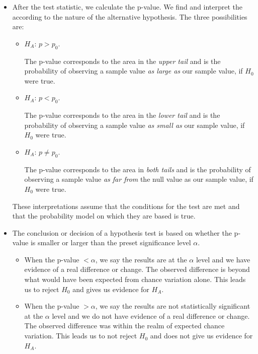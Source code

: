 \begin{itemize}
\item After the test statistic, we calculate the p-value.  We find and interpret the  according to the nature of the alternative hypothesis.  The three possibilities are:\vspace{-1mm}
\begin{itemize}
\item[] $H_A$: $p>p_0$. \quad\parbox[t]{3.84in}{The p-value corresponds to the area in the \emph{upper tail} and is the probability of observing a sample value \textit{as large as} our sample value, if $H_0$ were true. }
\item[] $H_A$: $p < p_0$. \quad\parbox[t]{3.84in}{The p-value corresponds to the area in the \emph{lower tail} and is the probability of observing a sample value \textit{as small as} our sample value, if $H_0$ were true. }
\item[] $H_A$: $p \ne p_0$. \quad\parbox[t]{3.84in}{The p-value corresponds to the area in \emph{both tails} and is the probability of observing a sample value \textit{as far from} the null value as our sample value, if $H_0$ were true. }
\end{itemize}
These interpretations assume that the conditions for the test are met and that the probability model on which they are based is true.

\item The conclusion or decision of a hypothesis test is based on whether the p-value is smaller or larger than the preset significance level $\alpha$. \vspace{-1mm}
\begin{itemize}
\item When the  p-value $< \alpha$, we say the results are  at the $\alpha$ level and we have evidence of a real difference or change.  The observed difference is beyond what would have been expected from chance variation alone.  This leads us to reject $H_0$ and gives us evidence for $H_A$.
\item When the  p-value $> \alpha$, we say the results are not statistically significant at the $\alpha$ level and we do not have evidence of a real difference or change.  The observed difference was within the realm of expected chance variation.  This leads us to not reject $H_0$ and does not give us evidence for $H_A$.
\end{itemize}

\D{\newpage}


\end{itemize}
